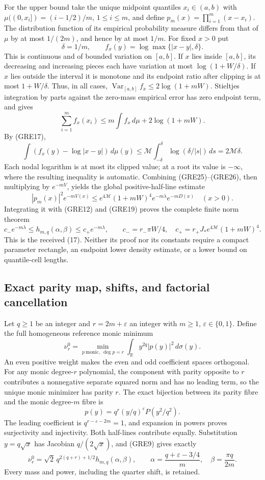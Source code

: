\documentclass[11pt,a4paper]{article}
\begin{document}
For the upper bound take the unique midpoint quantiles $x_i\in(a,b)$
with $\mu((0,x_i])=(i-1/2)/m$, $1\le i\le m$, and define
$p_m(x)=\prod_{i=1}^m(x-x_i)$. The distribution function of its
empirical probability measure differs from that of $\mu$ by at most
$1/(2m)$, and hence by at most $1/m$. For fixed $x>0$ put
\[
 \delta=1/m,\qquad f_x(y)=\log\max\{|x-y|,\delta\}.
\]
This is continuous and of bounded variation on $[a,b]$. If $x$ lies
inside $[a,b]$, its decreasing and increasing pieces each have
variation at most $\log(1+W/\delta)$. If $x$ lies outside the
interval it is monotone and its endpoint ratio after clipping is
at most $1+W/\delta$. Thus, in all cases,
$\operatorname{Var}_{[a,b]} f_x\le2\log(1+mW)$.
Stieltjes integration by parts against the zero-mass empirical error
has zero endpoint term, and gives
\[
 \sum_{i=1}^m f_x(x_i)
 \le m\int f_x\,d\mu+2\log(1+mW).
 \tag{GRE25}
\]
By (GRE17),
\[
 \int(f_x(y)-\log|x-y|)\,d\mu(y)
 \le\mathcal M\int_{-\delta}^{\delta}
                      \log(\delta/|s|)\,ds
 =2\mathcal M\delta.
 \tag{GRE26}
\]
Each nodal logarithm is at most its clipped value; at a root its
value is $-\infty$, where the resulting inequality is automatic.
Combining (GRE25)--(GRE26), then multiplying by $e^{-mV}$, yields
the global positive-half-line estimate
\[
 |p_m(x)|^2e^{-mV(x)}
 \le e^{4\mathcal M}(1+mW)^4
                         e^{-m\lambda}e^{-mD(x)}\quad(x>0).
 \tag{GRE27}
\]
Integrating it with (GRE12) and (GRE19) proves the complete finite
norm theorem
\[
 \boxed{c_-e^{-m\lambda}\le h_{m,q}(\alpha,\beta)
                    \le c_+e^{-m\lambda},\qquad
 c_-=r_-\pi W/4,\quad
 c_+=r_+J_*e^{4\mathcal M}(1+mW)^4.}
 \tag{GRE28}
\]
This is the received (17). Neither its proof nor its constants require
a compact parameter rectangle, an endpoint lower density estimate,
or a lower bound on quantile-cell lengths.

\subsection{Exact parity map, shifts, and factorial cancellation}

Let $q\ge1$ be an integer and $r=2m+\varepsilon$ an integer with
$m\ge1$, $\varepsilon\in\{0,1\}$. Define the full homogeneous
reference monic minimum
\[
 \nu_r^0=
 \min_{p\ \text{monic},\ \deg p=r}
         \int_{\mathbb R}y^{2q}|p(y)|^2\,d\sigma(y).
 \tag{GRE29}
\]
An even positive weight makes the even and odd coefficient spaces
orthogonal. For any monic degree-$r$ polynomial, the component with
parity opposite to $r$ contributes a nonnegative separate squared norm and has no leading
term, so the unique monic minimizer has parity $r$. The exact bijection
between its parity fibre and the monic degree-$m$ fibre is
\[
 p(y)=q^r(y/q)^\varepsilon P(y^2/q^2).
 \tag{GRE30}
\]
The leading coefficient is $q^{r-\varepsilon-2m}=1$, and expansion
in powers proves surjectivity and injectivity. Both half-lines
contribute equally. Substitution $y=q\sqrt x$ has Jacobian
$q/(2\sqrt x)$, and (GRE9) gives exactly
\[
 \boxed{\nu_r^0=\sqrt2\,q^{2(q+r)+1/2}
      h_{m,q}(\alpha,\beta),\qquad
 \alpha=\frac{q+\varepsilon-3/4}{m},\quad
 \beta=\frac{\pi q}{2m}.}
 \tag{GRE31}
\]
Every mass and power, including the quarter shift, is retained.
\end{document}
